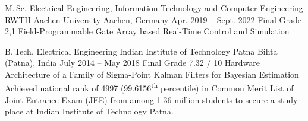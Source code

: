
\begin{cveducation}

\cvschool
	{M.\,Sc.} %
	{Electrical Engineering, Information Technology and Computer Engineering} %
	{RWTH Aachen University} %
	{Aachen, Germany  {\acvHeaderIconSep{}} {} } %
	{Apr. 2019 -- Sept. 2022  {\acvHeaderIconSep{}} {} } %
	{Final Grade 2,1  {\acvHeaderIconSep{}} {} } %
	{Field-Programmable Gate Array based Real-Time Control and Simulation} %
	{}

\cvschool
	{B.\,Tech.} %
	{Electrical Engineering} %
	{Indian Institute of Technology Patna} %
	{Bihta (Patna), India  {\acvHeaderIconSep{}} {} } %
	{July 2014 -- May 2018  {\acvHeaderIconSep{}} {} } %
	{Final Grade 7.32 / 10  {\acvHeaderIconSep{}} {} } %
	{Hardware Architecture of a Family of Sigma-Point Kalman Filters for Bayesian Estimation} %
	{ {\acvHeaderIconSep} {}Achieved national rank of 4997 (99.6156\textsuperscript{th} percentile) in Common Merit List of Joint Entrance Exam (JEE) from among 1.36 million students to secure a study place at Indian Institute of Technology Patna.} %



\end{cveducation}
